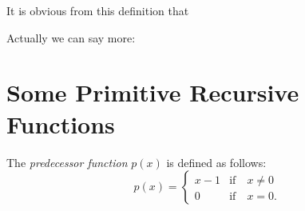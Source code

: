 \documentclass[a4paper,10pt,twoside]{book}
\begin{document}
It is obvious from this definition that


Actually we can say more:



\section{Some Primitive Recursive Functions}

The \textit{predecessor function} $p(x)$ is defined as follows: $$p(x)=\left\{\begin{array}{rll}x-1&\mathrm{if}\quad x\neq0\\0&\mathrm{if}\quad x=0.\end{array}\right.$$

\end{document}
